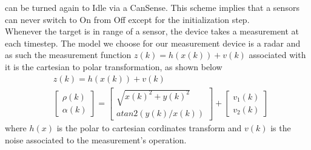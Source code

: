 \documentclass[twocolumn]{article}
\begin{document}
    can be turned again to Idle via a CanSense. This scheme implies that a sensors can never switch to On from Off except for the initialization step.
    \\
    Whenever the target is in range of a sensor, the device takes a measurement at each timestep.
    The model we choose for our measurement device is a radar and as such the measurement function 
    $z(k)=h(x(k))+v(k)$ associated with it is the cartesian to polar transformation, as shown below
    \begin{align*}
        &z(k)=h(x(k))+v(k)\\
        &\begin{bmatrix}
            \rho(k)\\ \alpha(k)
        \end{bmatrix}=  
        \begin{bmatrix}
            \sqrt{x(k)^2+y(k)^2}\\ atan2(y(k)/x(k))
        \end{bmatrix} +
        \begin{bmatrix}
            v_{1}(k)\\v_{2}(k)
        \end{bmatrix}
    \end{align*}
    where $h(x)$ is the polar to cartesian cordinates transform and $v(k)$ is the noise associated to the measurement's operation.
\end{document}
